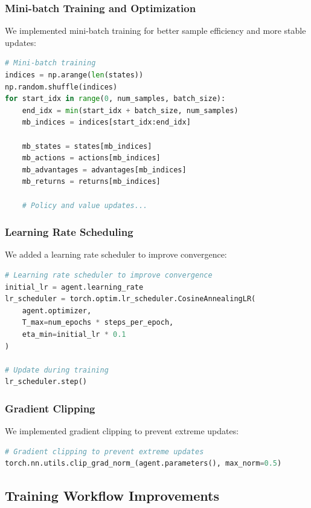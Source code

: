 \documentclass[11pt,a4paper]{article}
\begin{document}
\subsubsection{Mini-batch Training and Optimization}
We implemented mini-batch training for better sample efficiency and more stable updates:

\begin{lstlisting}[language=Python, caption=Mini-batch Training]
# Mini-batch training
indices = np.arange(len(states))
np.random.shuffle(indices)
for start_idx in range(0, num_samples, batch_size):
    end_idx = min(start_idx + batch_size, num_samples)
    mb_indices = indices[start_idx:end_idx]
    
    mb_states = states[mb_indices]
    mb_actions = actions[mb_indices]
    mb_advantages = advantages[mb_indices]
    mb_returns = returns[mb_indices]
    
    # Policy and value updates...
\end{lstlisting}

\subsubsection{Learning Rate Scheduling}
We added a learning rate scheduler to improve convergence:

\begin{lstlisting}[language=Python, caption=Learning Rate Scheduling]
# Learning rate scheduler to improve convergence
initial_lr = agent.learning_rate
lr_scheduler = torch.optim.lr_scheduler.CosineAnnealingLR(
    agent.optimizer, 
    T_max=num_epochs * steps_per_epoch, 
    eta_min=initial_lr * 0.1
)

# Update during training
lr_scheduler.step()
\end{lstlisting}

\subsubsection{Gradient Clipping}
We implemented gradient clipping to prevent extreme updates:

\begin{lstlisting}[language=Python, caption=Gradient Clipping]
# Gradient clipping to prevent extreme updates
torch.nn.utils.clip_grad_norm_(agent.parameters(), max_norm=0.5)
\end{lstlisting}

\subsection{Training Workflow Improvements}
\end{document}

